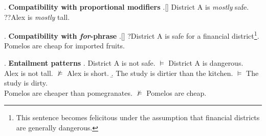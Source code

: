 \documentclass[12pt,letterpaper]{scrartcl}
\begin{document}
\ex.\label{PM} \textbf{Compatibility with proportional modifiers} 
\a.[] District A is \textit{mostly} safe. \\ ??Alex is \textit{mostly} tall.

\ex.\label{for} \textbf{Compatibility with \textit{for}-phrase}
\a.[] ?District A is safe for a financial district\footnote{This sentence becomes felicitous under the assumption that financial districts are generally dangerous.}.  \\
    Pomelos are cheap for imported fruits.

\ex.\label{EP} \textbf{Entailment patterns}
\a. District A is not safe. $\models$ District A is dangerous. \\
    Alex is not tall. $\nvDash$ Alex is short.
\b. The study is dirtier than the kitchen. $\models$ The study is dirty. \\
    Pomelos are cheaper than pomegranates. $\nvDash$ Pomelos are cheap.
\end{document}
